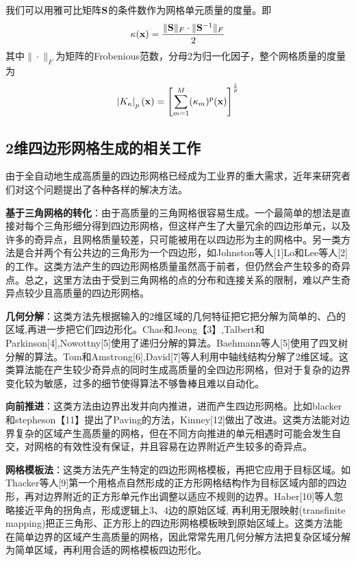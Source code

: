 我们可以用雅可比矩阵$\mathbf{S}$的条件数作为网格单元质量的度量。即
\begin{equation}\label{equ:Jac-condition}
\kappa(\mathbf{x})=\frac{\|\mathbf{S}\|_F \cdot \|\mathbf{S}^{-1}\|_F}{2}
\end{equation}
其中$\|\cdot\|_F$为矩阵的Frobenious范数，分母2为归一化因子，整个网格质量的度量为
\begin{equation}\label{equ:mesh-metric}
\left|K_{\kappa}\right|_p(\mathbf{x})=\left[\sum_{m=1}^M(\kappa_m)^p(\mathbf{x})\right]^{\frac{1}{p}}
\end{equation}
\subsection{2维四边形网格生成的相关工作}\label{related-work}
由于全自动地生成高质量的四边形网格已经成为工业界的重大需求，近年来研究者们对这个问题提出了各种各样的解决方法。

\textbf{基于三角网格的转化}：由于高质量的三角网格很容易生成。一个最简单的想法是直接对每个三角形细分得到四边形网格，但这样产生了大量冗余的四边形单元，以及许多的奇异点，且网格质量较差，只可能被用在以四边形为主的网格中。另一类方法是合并两个有公共边的三角形为一个四边形，如Johnston等人[1]Lo和Lee等人[2]的工作。这类方法产生的四边形网格质量虽然高于前者，但仍然会产生较多的奇异点。总之，这里方法由于受到三角网格的点的分布和连接关系的限制，难以产生奇异点较少且高质量的四边形网格。

\textbf{几何分解}：这类方法先根据输入的2维区域的几何特征把它把分解为简单的、凸的区域,再进一步把它们四边形化。Chae和Jeong【3】,Talbert和Parkinson[4],Nowottny[5]使用了递归分解的算法。Baehmann等人[5]使用了四叉树分解的算法。Tom和Amstrong[6],David[7]等人利用中轴线结构分解了2维区域。这类算法能在产生较少奇异点的同时生成高质量的全四边形网格，但对于复杂的边界变化较为敏感，过多的细节使得算法不够鲁棒且难以自动化。

\textbf{向前推进}：这类方法由边界出发并向内推进，进而产生四边形网格。比如blacker 和stepheson【11】提出了Paving的方法，Kinney[12]做出了改进。这类方法能对边界复杂的区域产生高质量的网格，但在不同方向推进的单元相遇时可能会发生自交，对网格的有效性没有保证，并且容易在边界附近产生较多的奇异点。

\textbf{网格模板法}：这类方法先产生特定的四边形网格模板，再把它应用于目标区域。如Thacker等人[9]第一个用格点自然形成的正方形网格结构作为目标区域内部的四边形，再对边界附近的正方形单元作出调整以适应不规则的边界。Haber[10]等人忽略接近平角的拐角点，形成逻辑上3、4边的原始区域, 再利用无限映射(transfinite mapping)把正三角形、正方形上的四边形网格模板映到原始区域上。这类方法能在简单边界的区域产生高质量的网格，因此常常先用几何分解方法把复杂区域分解为简单区域，再利用合适的网格模板四边形化。

